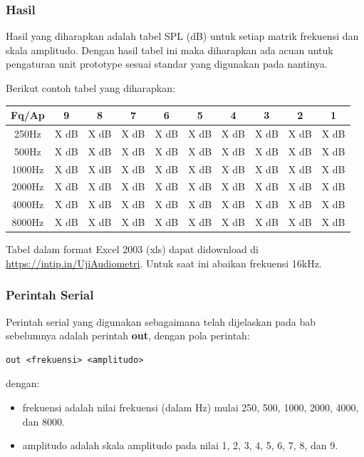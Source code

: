 \documentclass[12pt,]{article}
\begin{document}
	\subsubsection{Hasil}
	
	Hasil yang diharapkan adalah tabel SPL (dB) untuk setiap matrik frekuensi dan skala amplitudo.
	Dengan hasil tabel ini maka diharapkan ada acuan untuk pengaturan unit prototype sesuai standar yang digunakan pada nantinya.
	
	Berikut contoh tabel yang diharapkan:
	
	\begin{center}
		\begin{tabular}{|c|c|c|c|c|c|c|c|c|c|}
			\hline
			Fq/Ap & 9 & 8 & 7 & 6 & 5 & 4 & 3 & 2 & 1\\ [0.5ex]
			\hline\hline
			250Hz & X dB & X dB & X dB & X dB & X dB & X dB & X dB & X dB & X dB\\
			\hline
			500Hz & X dB & X dB & X dB & X dB & X dB & X dB & X dB & X dB & X dB\\
			\hline
			1000Hz & X dB & X dB & X dB & X dB & X dB & X dB & X dB & X dB & X dB\\
			\hline
			2000Hz & X dB & X dB & X dB & X dB & X dB & X dB & X dB & X dB & X dB\\
			\hline
			4000Hz & X dB & X dB & X dB & X dB & X dB & X dB & X dB & X dB & X dB\\
			\hline
			8000Hz & X dB & X dB & X dB & X dB & X dB & X dB & X dB & X dB & X dB\\
			\hline
		\end{tabular}
	\end{center}
	
	Tabel dalam format Excel 2003 (xls) dapat didownload di \url{https://intip.in/UjiAudiometri}.
	Untuk saat ini abaikan frekuensi 16kHz.
	
	\subsubsection{Perintah Serial}
	
	Perintah serial yang digunakan sebagaimana telah dijelaskan pada bab sebelumnya adalah perintah \textbf{out},
	dengan pola perintah:
	\begin{verbatim}
out <frekuensi> <amplitudo>
	\end{verbatim}
	dengan:
	\begin{itemize}
		\item frekuensi adalah nilai frekuensi (dalam Hz) mulai 250, 500, 1000, 2000, 4000, dan 8000.
		\item amplitudo adalah skala amplitudo pada nilai 1, 2, 3, 4, 5, 6, 7, 8, dan 9.
	\end{itemize}
	
\end{document}
